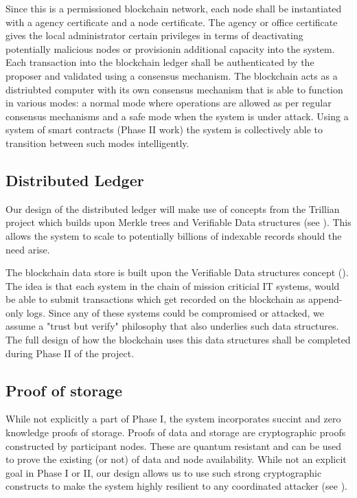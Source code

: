 Since this is a permissioned blockchain network, each node shall be instantiated with a agency certificate and a node
certificate. The agency or office certificate gives the local administrator certain privileges in terms of deactivating
potentially malicious nodes or provisionin additional capacity into the system. Each transaction into the blockchain
ledger shall be authenticated by the proposer and validated using a consensus mechanism. The blockchain acts as a
distriubted computer with its own consensus mechanism that is able to function in various modes: a normal mode where
operations are allowed as per regular consensus mechanisms and a safe mode when the system is under attack. Using a
system of smart contracts (Phase II work) the system is collectively able to transition between such modes intelligently.

\subsection{Distributed Ledger}

Our design of the distributed ledger will make use of concepts from the Trillian project which builds upon Merkle trees
and Verifiable Data structures (see \cite{verifiable2015}). This allows the system to scale to potentially billions of
indexable records should the need arise.

The blockchain data store is built upon the Verifiable Data structures concept (\cite{verifiable2015}). The idea is that each
system in the chain of mission criticial IT systems, would be able to submit transactions which get recorded on the
blockchain as append-only logs. Since any of these systems could be compromised or attacked, we assume a "trust but
verify" philosophy that also underlies such data structures. The full design of how the blockchain uses this data
structures shall be completed during Phase II of the project.

\subsection{Proof of storage}

While not explicitly a part of Phase I, the system incorporates succint and zero knowledge proofs of storage. Proofs
of data and storage are cryptographic proofs constructed by participant nodes. These are quantum resistant and can be
used to prove the existing (or not) of data and node availability. While not an explicit goal in Phase I or II, our
design allows us to use such strong cryptographic constructs to make the system highly resilient to any coordinated
attacker (see \cite{ben2019}).

